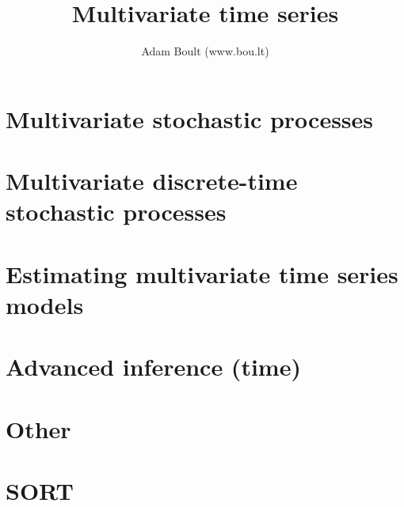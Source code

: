 \documentclass[oneside]{book}
\begin{document}
\author{Adam Boult (www.bou.lt)}
\title{Multivariate time series}
\maketitle

\setcounter{tocdepth}{0}
\tableofcontents



\part{Multivariate stochastic processes}



\part{Multivariate discrete-time stochastic processes}





\part{Estimating multivariate time series models}


\part{Advanced inference (time)}




\part{Other}


\part{SORT}

\end{document}
